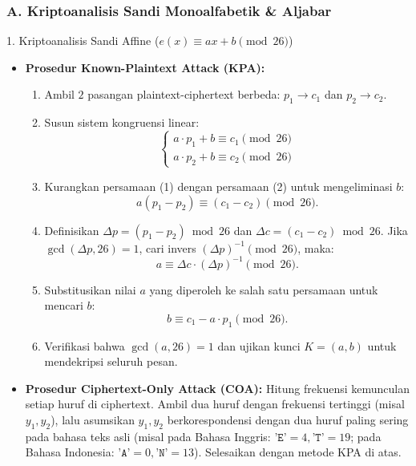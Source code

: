 \documentclass[11pt,a4paper]{article}
\begin{document}
\subsubsection{A. Kriptoanalisis Sandi Monoalfabetik \& Aljabar}

\begin{teoribox}{1. Kriptoanalisis Sandi Affine ($e(x) \equiv ax + b \pmod{26}$)}
\begin{itemize}[leftmargin=*]
    \item \textbf{Prosedur Known-Plaintext Attack (KPA):}
    \begin{enumerate}[label=\textbf{Langkah \arabic*:}, leftmargin=*]
        \item Ambil $2$ pasangan plaintext-ciphertext berbeda: $p_1 \to c_1$ dan $p_2 \to c_2$.
        \item Susun sistem kongruensi linear:
        \[
        \begin{cases} a \cdot p_1 + b \equiv c_1 \pmod{26} \\ a \cdot p_2 + b \equiv c_2 \pmod{26} \end{cases}
        \]
        \item Kurangkan persamaan (1) dengan persamaan (2) untuk mengeliminasi $b$:
        \[
        a(p_1 - p_2) \equiv (c_1 - c_2) \pmod{26}.
        \]
        \item Definisikan $\Delta p = (p_1 - p_2) \bmod 26$ dan $\Delta c = (c_1 - c_2) \bmod 26$. Jika $\gcd(\Delta p, 26) = 1$, cari invers $(\Delta p)^{-1} \pmod{26}$, maka:
        \[
        a \equiv \Delta c \cdot (\Delta p)^{-1} \pmod{26}.
        \]
        \item Substitusikan nilai $a$ yang diperoleh ke salah satu persamaan untuk mencari $b$:
        \[
        b \equiv c_1 - a \cdot p_1 \pmod{26}.
        \]
        \item Verifikasi bahwa $\gcd(a, 26) = 1$ dan ujikan kunci $K = (a, b)$ untuk mendekripsi seluruh pesan.
    \end{enumerate}
    \item \textbf{Prosedur Ciphertext-Only Attack (COA):}
    Hitung frekuensi kemunculan setiap huruf di ciphertext. Ambil dua huruf dengan frekuensi tertinggi (misal $y_1, y_2$), lalu asumsikan $y_1, y_2$ berkorespondensi dengan dua huruf paling sering pada bahasa teks asli (misal pada Bahasa Inggris: $\texttt{'E'} = 4, \texttt{'T'} = 19$; pada Bahasa Indonesia: $\texttt{'A'} = 0, \texttt{'N'} = 13$). Selesaikan dengan metode KPA di atas.
\end{itemize}
\end{teoribox}
\end{document}
